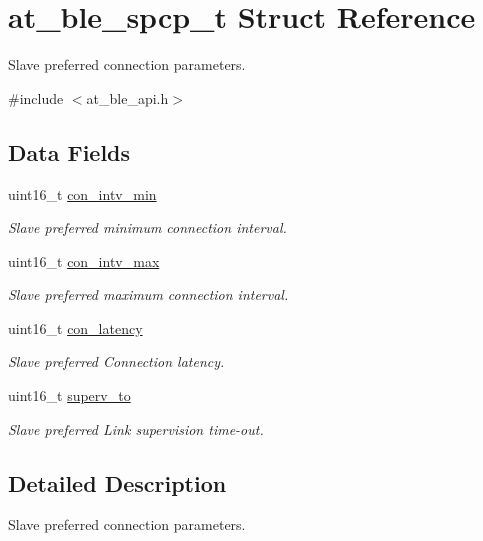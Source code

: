 \hypertarget{structat__ble__spcp__t}{}\section{at\+\_\+ble\+\_\+spcp\+\_\+t Struct Reference}
\label{structat__ble__spcp__t}


Slave preferred connection parameters.  




{\ttfamily \#include $<$at\+\_\+ble\+\_\+api.\+h$>$}

\subsection*{Data Fields}
\begin{DoxyCompactItemize}
\item 
uint16\+\_\+t \mbox{\hyperlink{structat__ble__spcp__t_a68d4f4fa7525b2b45377b8c4cbdd4c46}{con\+\_\+intv\+\_\+min}}
\begin{DoxyCompactList}\small\item\em Slave preferred minimum connection interval. \end{DoxyCompactList}\item 
uint16\+\_\+t \mbox{\hyperlink{structat__ble__spcp__t_ac54a0ba78bb94b5e8ec8924e7ed2e641}{con\+\_\+intv\+\_\+max}}
\begin{DoxyCompactList}\small\item\em Slave preferred maximum connection interval. \end{DoxyCompactList}\item 
uint16\+\_\+t \mbox{\hyperlink{structat__ble__spcp__t_a7a288732b0f90cff943de752cbeb8df4}{con\+\_\+latency}}
\begin{DoxyCompactList}\small\item\em Slave preferred Connection latency. \end{DoxyCompactList}\item 
uint16\+\_\+t \mbox{\hyperlink{structat__ble__spcp__t_a2bfc39c9b1e75f97c055d5978387570d}{superv\+\_\+to}}
\begin{DoxyCompactList}\small\item\em Slave preferred Link supervision time-\/out. \end{DoxyCompactList}\end{DoxyCompactItemize}


\subsection{Detailed Description}
Slave preferred connection parameters. 

